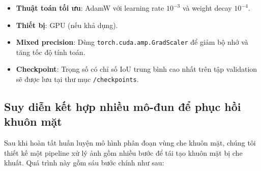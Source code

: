 \documentclass[12pt,a4paper]{article}
\begin{document}
	\begin{itemize}
		\item \textbf{Thuật toán tối ưu}: AdamW với learning rate $10^{-3}$ và weight decay $10^{-4}$.
		\item \textbf{Thiết bị}: GPU (nếu khả dụng).
		\item \textbf{Mixed precision}: Dùng \texttt{torch.cuda.amp.GradScaler} để giảm bộ nhớ và tăng tốc độ tính toán.
		\item \textbf{Checkpoint}: Trọng số có chỉ số IoU trung bình cao nhất trên tập validation sẽ được lưu tại thư mục \texttt{/checkpoints}.
	\end{itemize}
	
	\subsection{Suy diễn kết hợp nhiều mô-đun để phục hồi khuôn mặt}
	
	Sau khi hoàn tất huấn luyện mô hình phân đoạn vùng che khuôn mặt, chúng tôi thiết kế một pipeline xử lý ảnh gồm nhiều bước để tái tạo khuôn mặt bị che khuất. Quá trình này gồm sáu bước chính như sau:
	
\end{document}
